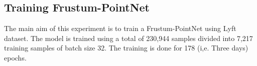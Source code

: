 \documentclass[10pt,twocolumn,letterpaper]{article}
\begin{document}
\subsection{Training Frustum-PointNet }
The main aim of this experiment is to train a  Frustum-PointNet using Lyft dataset. The model is trained using a total of 230,944 samples divided into 7,217 training samples of batch size 32. The training is done for 178 (i,e. Three days) epochs.
\end{document}
